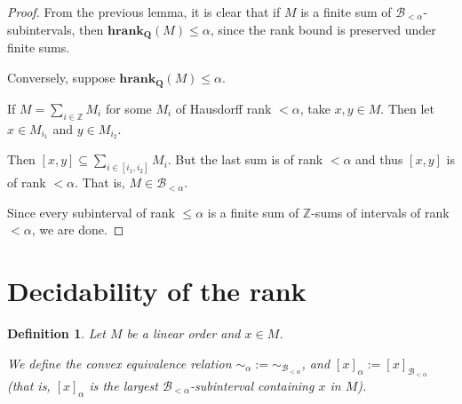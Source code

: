 \documentclass{article}
\newtheorem{definition}{Definition}
\newcommand{\brackets}[1]{\left[ {#1} \right]}
\newcommand{\hrank}[1]{\mathbf{hrank}_{\qq}\left( #1 \right)}
\newcommand{\qq}{\mathbf{Q}}
\newcommand{\ZZ}{\mathbb{Z}}
\begin{document}
\begin{proof}
  From the previous lemma, it is clear that if $M$ is a finite sum of $\mathcal{B}_{< \alpha}$-subintervals,
  then $\hrank{M} \le \alpha$, since the rank bound is preserved under finite sums.

  Conversely, suppose $\hrank{M} \le \alpha$.

  If $M = \sum_{i \in \ZZ} M_i$ for some $M_i$ of Hausdorff rank $< \alpha$,
  take $x, y \in M$. Then let $x \in M_{i_1}$ and $y \in M_{i_2}$.

  Then $[x, y] \subseteq \sum_{i \in [i_1, i_2]} M_i$. But the last sum is of rank $< \alpha$
  and thus $[x, y]$ is of rank $< \alpha$. That is, $M \in \mathcal{B}_{< \alpha}$.

  Since every subinterval of rank $\le \alpha$ is a finite sum of $\ZZ$-sums of intervals of rank $< \alpha$,
  we are done.
\end{proof}

\section{Decidability of the rank}

\begin{definition}
  Let $M$ be a linear order and $x \in M$.

  We define the convex equivalence relation $\sim_\alpha := \sim_{\mathcal{B}_{< \alpha}}$,
  and $\brackets{x}_{\alpha} := \brackets{x}_{\mathcal{B}_{< \alpha}}$ (that is,
  $\brackets{x}_{\alpha}$ is the largest $\mathcal{B}_{< \alpha}$-subinterval
  containing $x$ in $M$).
\end{definition}
\end{document}
